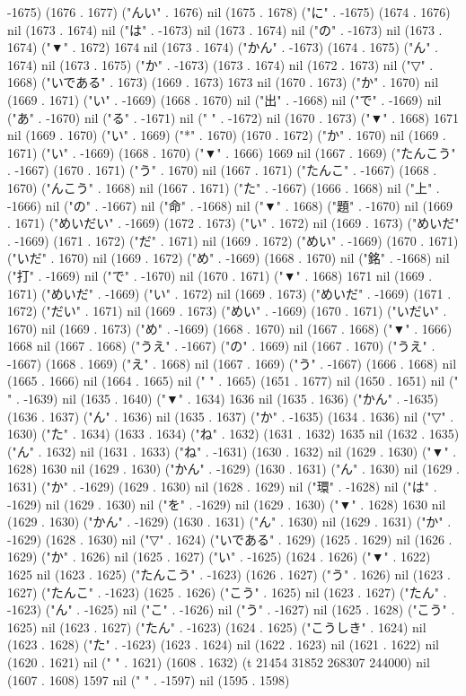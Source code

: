 -1675) (1676 . 1677) ("んい" . 1676) nil (1675 . 1678) ("に" . -1675) (1674 . 1676) nil (1673 . 1674) nil ("は" . -1673) nil (1673 . 1674) nil ("の" . -1673) nil (1673 . 1674) ("▼" . 1672) 1674 nil (1673 . 1674) ("かん" . -1673) (1674 . 1675) ("ん" . 1674) nil (1673 . 1675) ("か" . -1673) (1673 . 1674) nil (1672 . 1673) nil ("▽" . 1668) ("いである" . 1673) (1669 . 1673) 1673 nil (1670 . 1673) ("か" . 1670) nil (1669 . 1671) ("い" . -1669) (1668 . 1670) nil ("出" . -1668) nil ("で" . -1669) nil ("あ" . -1670) nil ("る" . -1671) nil (" " . -1672) nil (1670 . 1673) ("▼" . 1668) 1671 nil (1669 . 1670) ("い" . 1669) ("*" . 1670) (1670 . 1672) ("か" . 1670) nil (1669 . 1671) ("い" . -1669) (1668 . 1670) ("▼" . 1666) 1669 nil (1667 . 1669) ("たんこう" . -1667) (1670 . 1671) ("う" . 1670) nil (1667 . 1671) ("たんこ" . -1667) (1668 . 1670) ("んこう" . 1668) nil (1667 . 1671) ("た" . -1667) (1666 . 1668) nil ("上" . -1666) nil ("の" . -1667) nil ("命" . -1668) nil ("▼" . 1668) ("題" . -1670) nil (1669 . 1671) ("めいだい" . -1669) (1672 . 1673) ("い" . 1672) nil (1669 . 1673) ("めいだ" . -1669) (1671 . 1672) ("だ" . 1671) nil (1669 . 1672) ("めい" . -1669) (1670 . 1671) ("いだ" . 1670) nil (1669 . 1672) ("め" . -1669) (1668 . 1670) nil ("銘" . -1668) nil ("打" . -1669) nil ("で" . -1670) nil (1670 . 1671) ("▼" . 1668) 1671 nil (1669 . 1671) ("めいだ" . -1669) ("い" . 1672) nil (1669 . 1673) ("めいだ" . -1669) (1671 . 1672) ("だい" . 1671) nil (1669 . 1673) ("めい" . -1669) (1670 . 1671) ("いだい" . 1670) nil (1669 . 1673) ("め" . -1669) (1668 . 1670) nil (1667 . 1668) ("▼" . 1666) 1668 nil (1667 . 1668) ("うえ" . -1667) ("の" . 1669) nil (1667 . 1670) ("うえ" . -1667) (1668 . 1669) ("え" . 1668) nil (1667 . 1669) ("う" . -1667) (1666 . 1668) nil (1665 . 1666) nil (1664 . 1665) nil (" " . 1665) (1651 . 1677) nil (1650 . 1651) nil (" " . -1639) nil (1635 . 1640) ("▼" . 1634) 1636 nil (1635 . 1636) ("かん" . -1635) (1636 . 1637) ("ん" . 1636) nil (1635 . 1637) ("か" . -1635) (1634 . 1636) nil ("▽" . 1630) ("た" . 1634) (1633 . 1634) ("ね" . 1632) (1631 . 1632) 1635 nil (1632 . 1635) ("ん" . 1632) nil (1631 . 1633) ("ね" . -1631) (1630 . 1632) nil (1629 . 1630) ("▼" . 1628) 1630 nil (1629 . 1630) ("かん" . -1629) (1630 . 1631) ("ん" . 1630) nil (1629 . 1631) ("か" . -1629) (1629 . 1630) nil (1628 . 1629) nil ("環" . -1628) nil ("は" . -1629) nil (1629 . 1630) nil ("を" . -1629) nil (1629 . 1630) ("▼" . 1628) 1630 nil (1629 . 1630) ("かん" . -1629) (1630 . 1631) ("ん" . 1630) nil (1629 . 1631) ("か" . -1629) (1628 . 1630) nil ("▽" . 1624) ("いである" . 1629) (1625 . 1629) nil (1626 . 1629) ("か" . 1626) nil (1625 . 1627) ("い" . -1625) (1624 . 1626) ("▼" . 1622) 1625 nil (1623 . 1625) ("たんこう" . -1623) (1626 . 1627) ("う" . 1626) nil (1623 . 1627) ("たんこ" . -1623) (1625 . 1626) ("こう" . 1625) nil (1623 . 1627) ("たん" . -1623) ("ん" . -1625) nil ("こ" . -1626) nil ("う" . -1627) nil (1625 . 1628) ("こう" . 1625) nil (1623 . 1627) ("たん" . -1623) (1624 . 1625) ("こうしき" . 1624) nil (1623 . 1628) ("た" . -1623) (1623 . 1624) nil (1622 . 1623) nil (1621 . 1622) nil (1620 . 1621) nil (" " . 1621) (1608 . 1632) (t 21454 31852 268307 244000) nil (1607 . 1608) 1597 nil (" " . -1597) nil (1595 . 1598) 